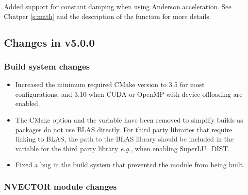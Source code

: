 Added support for constant damping when using Anderson acceleration. See Chatper
\ref{s:math} and the description of the  function for more
details.

\subsection*{Changes in v5.0.0}

\subsubsection*{Build system changes}

\begin{itemize}
\item Increased the minimum required CMake version to 3.5 for most {\sundials}
configurations, and 3.10 when CUDA or OpenMP with device offloading are enabled.
%
\item The CMake option  and the variable  have
been removed to simplify builds as {\sundials} packages do not use BLAS
directly. For third party libraries that require linking to BLAS, the path to
the BLAS library should be included in the  variable for the
third party library \textit{e.g.},  when enabling
SuperLU\_DIST.
%
\item Fixed a bug in the build system that prevented the {\nvecpthreads} module from
being built.
\end{itemize}

\subsubsection*{NVECTOR module changes}

